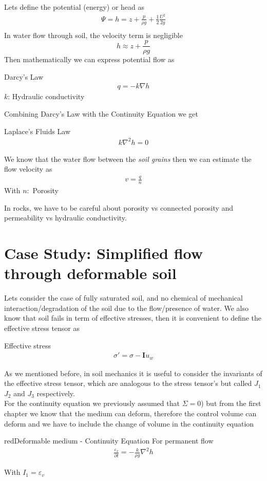 \documentclass[a4paper, 11pt,article,oneside]{memoir}%
\begin{document}
Lets define the potential (energy) or head as
\begin{gather*}
\Psi=h=z+\frac{p}{\rho g}+\frac{1}{2}\frac{U^2}{2g}\\
\end{gather*}
In water flow through soil, the velocity term is negligible
$$ h\approx z+\frac{p}{\rho g}$$
Then mathematically we can express potential flow as 
\begin{eqbox2}{}{Darcy's Law}
\begin{gather*}
q=-k\nabla h
\end{gather*}
$k$: Hydraulic conductivity 
\end{eqbox2} 
Combining Darcy's Law with the Continuity Equation we get 
\begin{eqbox2}{}{Laplace's Fluids Law}
\begin{gather*}
k\nabla^2h=0
\end{gather*}
\end{eqbox2}
We know that the water flow between the \textit{soil grains} then we can estimate the flow velocity as 
\begin{gather*}
v=\frac{q}{n}
\end{gather*}
With $n: $ Porosity
\begin{note}
In rocks, we have to be careful about porosity vs connected porosity and permeability vs hydraulic conductivity.\end{note} 
\section{Case Study: Simplified flow through deformable soil}
Lets consider the case of fully saturated soil, and no chemical of mechanical interaction/degradation of the soil due to the flow/presence of water. We also know that soil fails in term of effective stresses, then it is convenient to define the effective stress tensor as
\begin{eqbox2}{}{Effective stress} 
\begin{align*}
\sigma'=\sigma-\boldsymbol{I}u_w
\end{align*}
\end{eqbox2}
As we mentioned before, in soil mechanics it is useful to consider the invariants of the effective stress tensor, which are analogous to the stress tensor's but called $J_1$ $J_2$ and $J_3$ respectively.\\
For the continuity equation we previously assumed that $ \Sigma=0$) but from the first chapter we know that the medium can deform, therefore the control volume can deform and we have to include the change of volume in the continuity equation
\begin{eqbox2}{red}{Deformable medium - Continuity Equation}
For permanent flow
\begin{align*}
\frac{\varepsilon_v}{\partial t}=-\frac{k}{\rho g} \nabla^2 h
\end{align*}
\end{eqbox2}
With 
$I_1=\varepsilon_v$
\end{document}
